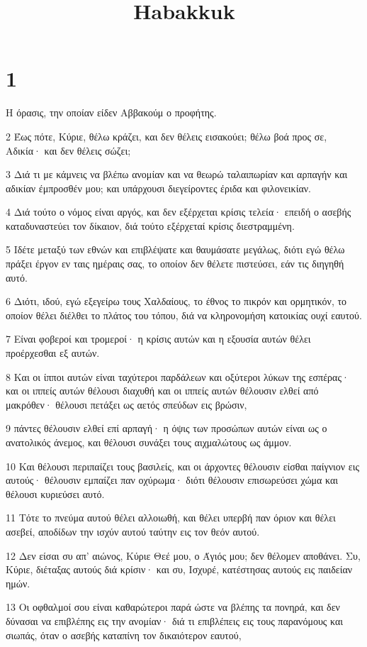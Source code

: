 

\title{Habakkuk}


\chapter{1}

\par Η όρασις, την οποίαν είδεν Αββακούμ ο προφήτης.
\par 2 Έως πότε, Κύριε, θέλω κράζει, και δεν θέλεις εισακούει; θέλω βοά προς σε, Αδικία· και δεν θέλεις σώζει;
\par 3 Διά τι με κάμνεις να βλέπω ανομίαν και να θεωρώ ταλαιπωρίαν και αρπαγήν και αδικίαν έμπροσθέν μου; και υπάρχουσι διεγείροντες έριδα και φιλονεικίαν.
\par 4 Διά τούτο ο νόμος είναι αργός, και δεν εξέρχεται κρίσις τελεία· επειδή ο ασεβής καταδυναστεύει τον δίκαιον, διά τούτο εξέρχεταί κρίσις διεστραμμένη.
\par 5 Ιδέτε μεταξύ των εθνών και επιβλέψατε και θαυμάσατε μεγάλως, διότι εγώ θέλω πράξει έργον εν ταις ημέραις σας, το οποίον δεν θέλετε πιστεύσει, εάν τις διηγηθή αυτό.
\par 6 Διότι, ιδού, εγώ εξεγείρω τους Χαλδαίους, το έθνος το πικρόν και ορμητικόν, το οποίον θέλει διέλθει το πλάτος του τόπου, διά να κληρονομήση κατοικίας ουχί εαυτού.
\par 7 Είναι φοβεροί και τρομεροί· η κρίσις αυτών και η εξουσία αυτών θέλει προέρχεσθαι εξ αυτών.
\par 8 Και οι ίπποι αυτών είναι ταχύτεροι παρδάλεων και οξύτεροι λύκων της εσπέρας· και οι ιππείς αυτών θέλουσι διαχυθή και οι ιππείς αυτών θέλουσιν ελθεί από μακρόθεν· θέλουσι πετάξει ως αετός σπεύδων εις βρώσιν,
\par 9 πάντες θέλουσιν ελθεί επί αρπαγή· η όψις των προσώπων αυτών είναι ως ο ανατολικός άνεμος, και θέλουσι συνάξει τους αιχμαλώτους ως άμμον.
\par 10 Και θέλουσι περιπαίζει τους βασιλείς, και οι άρχοντες θέλουσιν είσθαι παίγνιον εις αυτούς· θέλουσιν εμπαίζει παν οχύρωμα· διότι θέλουσιν επισωρεύσει χώμα και θέλουσι κυριεύσει αυτό.
\par 11 Τότε το πνεύμα αυτού θέλει αλλοιωθή, και θέλει υπερβή παν όριον και θέλει ασεβεί, αποδίδων την ισχύν αυτού ταύτην εις τον θεόν αυτού.
\par 12 Δεν είσαι συ απ' αιώνος, Κύριε Θεέ μου, ο Άγιός μου; δεν θέλομεν αποθάνει. Συ, Κύριε, διέταξας αυτούς διά κρίσιν· και συ, Ισχυρέ, κατέστησας αυτούς εις παιδείαν ημών.
\par 13 Οι οφθαλμοί σου είναι καθαρώτεροι παρά ώστε να βλέπης τα πονηρά, και δεν δύνασαι να επιβλέπης εις την ανομίαν· διά τι επιβλέπεις εις τους παρανόμους και σιωπάς, όταν ο ασεβής καταπίνη τον δικαιότερον εαυτού,
